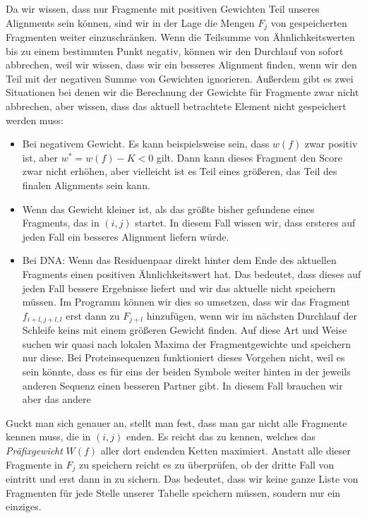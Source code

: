 Da wir wissen, dass nur Fragmente mit positiven Gewichten Teil unseres Alignments sein können, sind wir in der Lage die Mengen $F_j$ von gespeicherten Fragmenten weiter einzuschränken. Wenn die Teilsumme von Ähnlichkeitswerten bis zu einem bestimmten Punkt negativ, können wir den Durchlauf von  sofort abbrechen, weil wir wissen, dass wir ein besseres Alignment finden, wenn wir den Teil mit der negativen Summe von Gewichten ignorieren. Außerdem gibt es zwei Situationen bei denen wir die Berechnung der Gewichte für Fragmente zwar nicht abbrechen, aber wissen, dass das aktuell betrachtete Element nicht gespeichert werden muss:

\begin{itemize}
	\item Bei negativem Gewicht. Es kann beispielsweise sein, dass $w(f)$ zwar positiv ist, aber $w^* = w(f)-K < 0$ gilt. Dann kann dieses Fragment den Score zwar nicht erhöhen, aber vielleicht ist es Teil eines größeren, das Teil des finalen Alignments sein kann.
	\item Wenn das Gewicht kleiner ist, als das größte bisher gefundene eines Fragments, das in $(i,j)$ startet. In diesem Fall wissen wir, dass ersteres auf jeden Fall ein besseres Alignment liefern würde.
	\item Bei DNA: Wenn das Residuenpaar direkt hinter dem Ende des aktuellen Fragments einen positiven Ähnlichkeitswert hat. Das bedeutet, dass dieses auf jeden Fall bessere Ergebnisse liefert und wir das aktuelle nicht speichern müssen. Im Programm können wir dies so umsetzen, dass wir das Fragment $f_{i+l,j+l,l}$ erst dann zu $F_{j+l}$ hinzufügen, wenn wir im nächsten Durchlauf der Schleife  keins mit einem größeren Gewicht finden. Auf diese Art und Weise suchen wir quasi nach lokalen Maxima der Fragmentgewichte und speichern nur diese. Bei Proteinsequenzen funktioniert dieses Vorgehen nicht, weil es sein könnte, dass es für eins der beiden Symbole weiter hinten in der jeweils anderen Sequenz einen besseren Partner gibt. In diesem Fall brauchen wir aber das andere 
\end{itemize}

Guckt man sich  genauer an, stellt man fest, dass man gar nicht alle Fragmente kennen muss, die in $(i,j)$ enden. Es reicht das zu kennen, welches das \emph{Präfixgewicht} $W(f)$ aller dort endenden Ketten maximiert. Anstatt alle dieser Fragmente in $F_j$ zu speichern reicht es zu überprüfen, ob der dritte Fall von  eintritt und erst dann in  zu sichern. Das bedeutet, dass wir keine ganze Liste von Fragmenten für jede Stelle unserer Tabelle speichern müssen, sondern nur ein einziges.

